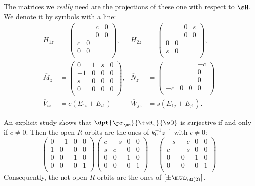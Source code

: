 The matrices we \emph{really} need are the projections of these one with respect to $\sH$. We denote it by  symbols with a line: 
\begin{subequations}
\begin{align}
\overline{H}_{1z}&=
\begin{pmatrix}
 &   &c  &0\\
 &   &0 &0\\
c & 0  &  &\\
0 & 0  &  &\\
\end{pmatrix},
&\overline{H}_{2z}&=
\begin{pmatrix}
 &   & 0 &s\\
 &   & 0 &0\\
0 & 0  &  &\\
s & 0  &  &\\
\end{pmatrix},\\
\overline{M}_z&=
\begin{pmatrix}
0  & 1 & s &0\\
-1 & 0 & 0 &0\\
s  & 0 & 0 &0\\
0  & 0 & 0 &0\\
\end{pmatrix},
&\overline{N}_z&=
\begin{pmatrix}
  &  &  &-c\\
  &  &  &0\\
  &  &  &0\\
-c & 0 & 0 &0\\
\end{pmatrix}\\
  \overline{V}_{iz}&=c(E_{1i}+E_{i1})
 &\overline{W}_{jz}&=s(E_{1j}+E_{j1}).
\end{align}
\end{subequations}

An explicit study shows that $\dpt{\pr_{\sH}}{\tsR_z}{\sQ}$ is surjective if and only if $c\neq 0$. Then the open $R$-orbits are the ones of $k_0^{-1} z^{-1}$ with $c\neq 0$:
\begin{equation}
\begin{pmatrix}
  0 & -1 & 0 & 0\\
  1 & 0  & 0 & 0\\
  0 & 0  & 1 & 0\\
  0 & 0  & 0 & 1\\
\end{pmatrix}
\begin{pmatrix}
  c & -s & 0 & 0\\
  s & c  & 0 & 0\\
  0 & 0  & 1 & 0\\
  0 & 0  & 0 & 1\\
\end{pmatrix}
=
\begin{pmatrix}
  -s & -c & 0 & 0\\
  c  & -s & 0 & 0\\
  0  &  0 & 1 & 0\\
  0  & 0  & 0 & 1\\
\end{pmatrix}
\end{equation}
Consequently, the not open $R$-orbits are the ones of $[\pm\mtu_{\SO(2)}]$.

